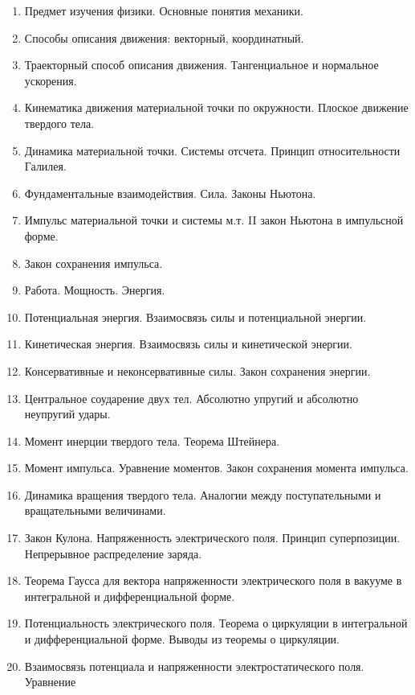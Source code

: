 \documentclass[12pt]{article}
\begin{document}
    \begin{enumerate}
        \item Предмет изучения физики. Основные понятия механики.  
        \item Способы описания движения: векторный, координатный.  
        \item Траекторный способ описания движения. Тангенциальное и нормальное ускорения. 
        \item Кинематика движения материальной точки по окружности. Плоское движение твердого 
        тела.  
        \item Динамика материальной точки. Системы отсчета. Принцип относительности Галилея. 
        \item Фундаментальные взаимодействия. Сила. Законы Ньютона. 
        \item Импульс материальной точки и системы м.т. II закон Ньютона в импульсной форме.  
        \item Закон сохранения импульса. 
        \item Работа. Мощность. Энергия.  
        \item Потенциальная энергия. Взаимосвязь силы и потенциальной энергии. 
        \item Кинетическая энергия. Взаимосвязь силы и кинетической энергии. 
        \item Консервативные и неконсервативные силы. Закон сохранения энергии.  
        \item Центральное соударение двух тел. Абсолютно упругий и абсолютно неупругий удары.  
        \item Момент инерции твердого тела. Теорема Штейнера. 
        \item Момент импульса. Уравнение моментов. Закон сохранения момента импульса.  
        \item Динамика вращения твердого тела. Аналогии между поступательными и вращательными 
        величинами. 
        \item Закон Кулона. Напряженность электрического поля. Принцип суперпозиции. 
        Непрерывное распределение заряда.  
        \item Теорема Гаусса для вектора напряженности электрического поля в вакууме в 
        интегральной и дифференциальной форме.  
        \item Потенциальность электрического поля. Теорема о циркуляции в интегральной и 
        дифференциальной форме. Выводы из теоремы о циркуляции. 
        \item Взаимосвязь потенциала и напряженности электростатического поля. Уравнение 

\end{enumerate}
\end{document}
